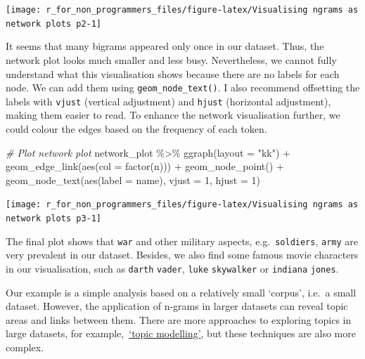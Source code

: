 \documentclass[
]{book}
\newenvironment{Shaded}{\begin{snugshade}}{\end{snugshade}}
\newcommand{\AttributeTok}[1]{\textcolor[rgb]{0.77,0.63,0.00}{#1}}
\newcommand{\CommentTok}[1]{\textcolor[rgb]{0.56,0.35,0.01}{\textit{#1}}}
\newcommand{\DecValTok}[1]{\textcolor[rgb]{0.00,0.00,0.81}{#1}}
\newcommand{\FunctionTok}[1]{\textcolor[rgb]{0.00,0.00,0.00}{#1}}
\newcommand{\NormalTok}[1]{#1}
\newcommand{\SpecialCharTok}[1]{\textcolor[rgb]{0.00,0.00,0.00}{#1}}
\newcommand{\StringTok}[1]{\textcolor[rgb]{0.31,0.60,0.02}{#1}}
\begin{document}
\begin{center}\texttt{[image: r\_for\_non\_programmers\_files/figure-latex/Visualising ngrams as network plots p2-1]} \end{center}

It seems that many bigrams appeared only once in our dataset. Thus, the network plot looks much smaller and less busy. Nevertheless, we cannot fully understand what this visualisation shows because there are no labels for each node. We can add them using \texttt{geom\_node\_text()}. I also recommend offsetting the labels with \texttt{vjust} (vertical adjustment) and \texttt{hjust} (horizontal adjustment), making them easier to read. To enhance the network visualisation further, we could colour the edges based on the frequency of each token.

\begin{Shaded}
\begin{Highlighting}[]
\CommentTok{\# Plot network plot}
\NormalTok{network\_plot }\SpecialCharTok{\%\textgreater{}\%}
  \FunctionTok{ggraph}\NormalTok{(}\AttributeTok{layout =} \StringTok{"kk"}\NormalTok{) }\SpecialCharTok{+}
  \FunctionTok{geom\_edge\_link}\NormalTok{(}\FunctionTok{aes}\NormalTok{(}\AttributeTok{col =} \FunctionTok{factor}\NormalTok{(n))) }\SpecialCharTok{+}
  \FunctionTok{geom\_node\_point}\NormalTok{() }\SpecialCharTok{+}
  \FunctionTok{geom\_node\_text}\NormalTok{(}\FunctionTok{aes}\NormalTok{(}\AttributeTok{label =}\NormalTok{ name),}
                 \AttributeTok{vjust =} \DecValTok{1}\NormalTok{,}
                 \AttributeTok{hjust =} \DecValTok{1}\NormalTok{)}
\end{Highlighting}
\end{Shaded}

\begin{center}\texttt{[image: r\_for\_non\_programmers\_files/figure-latex/Visualising ngrams as network plots p3-1]} \end{center}

The final plot shows that \texttt{war} and other military aspects, e.g.~\texttt{soldiers}, \texttt{army} are very prevalent in our dataset. Besides, we also find some famous movie characters in our visualisation, such as \texttt{darth} \texttt{vader}, \texttt{luke} \texttt{skywalker} or \texttt{indiana} \texttt{jones}.

Our example is a simple analysis based on a relatively small `corpus', i.e.~a small dataset. However, the application of n-grams in larger datasets can reveal topic areas and links between them. There are more approaches to exploring topics in large datasets, for example,~\href{https://www.tidytextmining.com/topicmodeling.html}{`topic modelling'}, but these techniques are also more complex.
\end{document}
